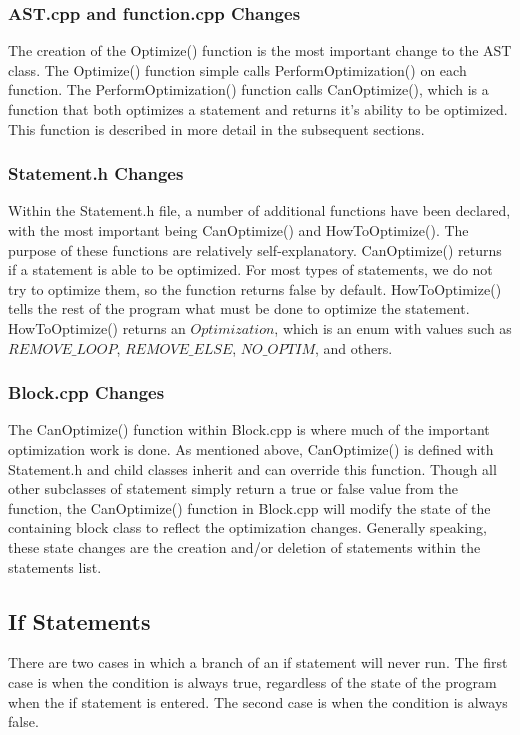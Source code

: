 \documentclass[sigconf]{acmart}
\begin{document}
\subsubsection{AST.cpp and function.cpp Changes}
The creation of the Optimize() function is the most important change to the AST class. The Optimize() function simple 
calls PerformOptimization() on each function. The PerformOptimization() function calls CanOptimize(), which is a function 
that both optimizes a statement and returns it's ability to be optimized. This function is described in more detail in the 
subsequent sections.

\subsubsection{Statement.h Changes}
Within the Statement.h file, a number of additional functions have been declared, with the most important being 
CanOptimize() and HowToOptimize(). The purpose of these functions are relatively self-explanatory. CanOptimize()
returns if a statement is able to be optimized. For most types of statements, we do not try to optimize them,
so the function returns false by default. HowToOptimize() tells the rest of the program what must be done to optimize 
the statement. HowToOptimize() returns an $Optimization$, which is an enum with values such as $REMOVE\_LOOP$, $REMOVE\_ELSE$, $NO\_OPTIM$,
and others. 

\subsubsection{Block.cpp Changes}
The CanOptimize() function within Block.cpp is where much of the important optimization work is done.
As mentioned above, CanOptimize() is defined with Statement.h and child classes inherit and can override this function.
Though all other subclasses of statement simply return a true or false value from the function, the CanOptimize() function 
in Block.cpp will modify the state of the containing block class to reflect the optimization changes. Generally speaking, 
these state changes are the creation and/or deletion of statements within the statements list.

\subsection{If Statements}
There are two cases in which a branch of an if statement will never run. The first case is when the condition 
is always true, regardless of the state of the program when the if statement is entered. The second case is when 
the condition is always false.
\end{document}
